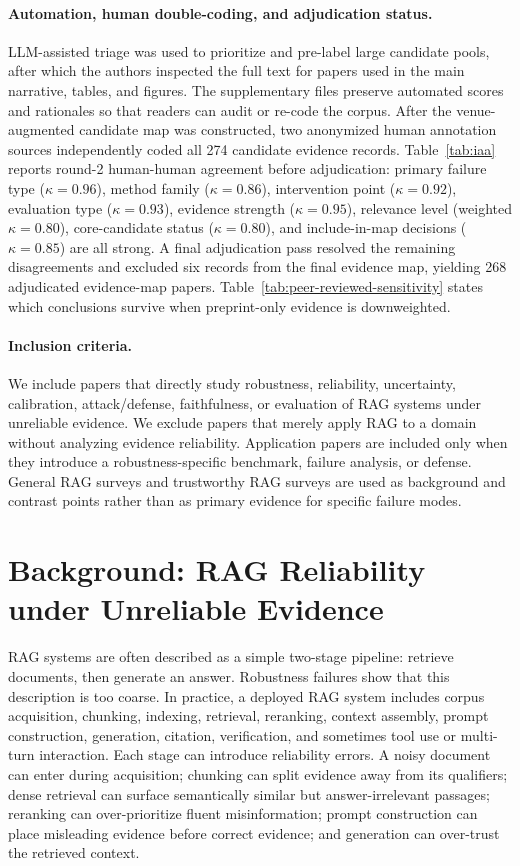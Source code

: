 \documentclass[11pt]{article}
\begin{document}
\paragraph{Automation, human double-coding, and adjudication status.}
LLM-assisted triage was used to prioritize and pre-label large candidate pools, after which the authors inspected the full text for papers used in the main narrative, tables, and figures. The supplementary files preserve automated scores and rationales so that readers can audit or re-code the corpus. After the venue-augmented candidate map was constructed, two anonymized human annotation sources independently coded all 274 candidate evidence records. Table~\ref{tab:iaa} reports round-2 human-human agreement before adjudication: primary failure type ($\kappa=0.96$), method family ($\kappa=0.86$), intervention point ($\kappa=0.92$), evaluation type ($\kappa=0.93$), evidence strength ($\kappa=0.95$), relevance level (weighted $\kappa=0.80$), core-candidate status ($\kappa=0.80$), and include-in-map decisions ($\kappa=0.85$) are all strong. A final adjudication pass resolved the remaining disagreements and excluded six records from the final evidence map, yielding 268 adjudicated evidence-map papers. Table~\ref{tab:peer-reviewed-sensitivity} states which conclusions survive when preprint-only evidence is downweighted.

\paragraph{Inclusion criteria.}
We include papers that directly study robustness, reliability, uncertainty, calibration, attack/defense, faithfulness, or evaluation of RAG systems under unreliable evidence. We exclude papers that merely apply RAG to a domain without analyzing evidence reliability. Application papers are included only when they introduce a robustness-specific benchmark, failure analysis, or defense. General RAG surveys and trustworthy RAG surveys are used as background and contrast points rather than as primary evidence for specific failure modes.

\section{Background: RAG Reliability under Unreliable Evidence}
\label{sec:background}

RAG systems are often described as a simple two-stage pipeline: retrieve documents, then generate an answer. Robustness failures show that this description is too coarse. In practice, a deployed RAG system includes corpus acquisition, chunking, indexing, retrieval, reranking, context assembly, prompt construction, generation, citation, verification, and sometimes tool use or multi-turn interaction. Each stage can introduce reliability errors. A noisy document can enter during acquisition; chunking can split evidence away from its qualifiers; dense retrieval can surface semantically similar but answer-irrelevant passages; reranking can over-prioritize fluent misinformation; prompt construction can place misleading evidence before correct evidence; and generation can over-trust the retrieved context.
\end{document}
